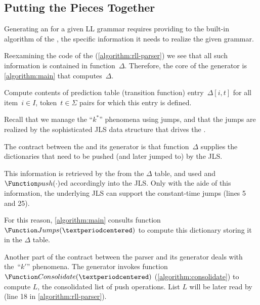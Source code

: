 \subsection{Putting the Pieces Together}
Generating an \RLLp for a given LL grammar requires providing to the 
built-in algorithm of the \RLLp, the specific information it needs to
realize the given grammar.

Reexamining the code of the \RLLp (\cref{algorithm:rll-parser}) 
  we see that all such information is contained in
  function~$\Delta$. 
Therefore, the core of the \RLLp generator is 
  \cref{algorithm:main} that computes~$\Delta$.

\begin{algorithm}[H]
  \caption{\label{algorithm:main}
    Compute contents of prediction table
    (transition function) entry~$Δ[i,t]$
    for all item~$i∈I$, token~$t ∈Σ$ pairs
    for which this entry is defined.
  }
  \begin{algorithmic}
     
        \CONTINUE {}
      \FI
           
           
        \FI
      \ENDFOR %
    \ENDFOR %
  \end{algorithmic}
\end{algorithm}

Recall that we manage the ``$k^*$'' phenomena using jumps, and that the
jumps are realized by the sophisticated JLS data structure that drives the
\RLLp.

The contract between the \RLLp and its generator is that function~$\Delta$
supplies the dictionaries that need to be pushed (and later jumped to)
by the JLS.

This information is retrieved by the \RLLp from the $\Delta$ table,
and used and $\Function push(\cdot)$ed accordingly into the JLS.
Only with the aide of this information, the underlying JLS can support the
constant-time jumps (lines 5 and 25).

For this reason, \cref{algorithm:main} consults function~$\Function Jumps(·)$
to compute this dictionary storing it in the $\Delta$ table.

Another part of the contract between the parser and its generator deals
with the~``$k'$'' phenomena.  The generator invokes function~$\Function
Consolidate(·)$ (\cref{algorithm:consolidate}) to
compute $L$, the consolidated list of push operations.  List $L$ will be later
read by \RLLp (line 18 in \cref{algorithm:rll-parser}).  

